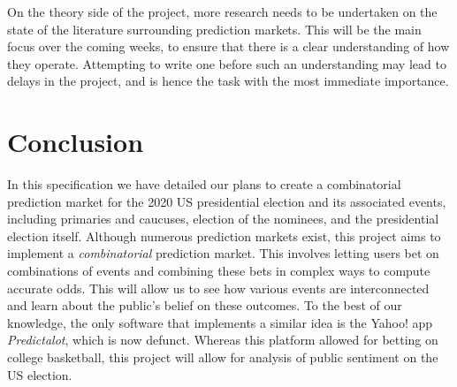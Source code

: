 \documentclass[10pt,a4paper]{article}
\theoremstyle{plain}
\theoremstyle{definition}
\begin{document}
	On the theory side of the project, more research needs to be undertaken on
	the state of the literature surrounding prediction markets. This will be
	the main focus over the coming weeks, to ensure that there is a clear
	understanding of how they operate. Attempting to write one before such an
	understanding may lead to delays in the project, and is hence the task with
	the most immediate importance.

\section{Conclusion}
	\label{sec:conclusion}

	In this specification we have detailed our plans to create a combinatorial
	prediction market for the 2020 US presidential election and its associated
	events, including primaries and caucuses, election of the nominees, and the
	presidential election itself. Although numerous prediction markets exist,
	this project aims to implement a \emph{combinatorial} prediction market.
	This involves letting users bet on combinations of events and combining
	these bets in complex ways to compute accurate odds. This will allow us to
	see how various events are interconnected and learn about the public's
	belief on these outcomes. To the best of our knowledge, the only software
	that implements a similar idea is the Yahoo! app \emph{Predictalot}, which
	is now defunct. Whereas this platform allowed for betting on college
	basketball, this project will allow for analysis of public sentiment on the
	US election.



\begin{appendices}


    
    

\end{appendices}
\end{document}
